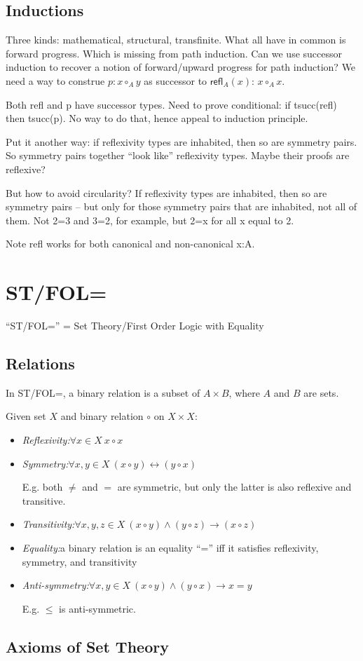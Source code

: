 \documentclass{article}
\begin{document}
\subsection{Inductions}

Three kinds: mathematical, structural, transfinite.  What all have in
common is forward progress.  Which is missing from path induction.
Can we use successor induction to recover a notion of forward/upward
progress for path induction?  We need a way to construe \(p{:}x\circ_A
y\) as successor to \(\textsf{refl}_A(x){:}\,x\circ_A x\).

Both refl and p have successor types.  Need to prove conditional: if
tsucc(refl) then tsucc(p).  No way to do that, hence appeal to induction
principle.

Put it another way: if reflexivity types are inhabited, then so are
symmetry pairs.  So symmetry pairs together ``look like'' reflexivity
types.  Maybe their proofs are reflexive?

But how to avoid circularity?  If reflexivity types are inhabited,
then so are symmetry pairs -- but only for those symmetry pairs that
are inhabited, not all of them.  Not 2=3 and 3=2, for example, but 2=x
for all x equal to 2.

Note refl works for both canonical and non-canonical x:A.

\section{ST/FOL=}

``ST/FOL='' = Set Theory/First Order Logic with Equality

\subsection{Relations}

In ST/FOL=, a binary relation is a subset of \(A\times B\), where
\(A\) and \(B\) are sets.

Given set \(X\) and binary relation \(\circ\) on \(X\times X\):

\begin{itemize}
\item \textit{Reflexivity:}\quad \(\forall x\in X\ x\circ x\)
\item \textit{Symmetry:}\quad \(\forall x,y\in X\  (x\circ y)\leftrightarrow (y\circ x)\)

  E.g. both \(\neq\) and \(=\) are symmetric, but only the latter is also reflexive and transitive.
\item \textit{Transitivity:}\quad \(\forall x,y,z\in X\  (x\circ y)\land(y\circ z)\to (x\circ z)\)
\item \textit{Equality:}\quad a binary relation is an equality ``='' iff it satisfies reflexivity, symmetry, and transitivity
\item \textit{Anti-symmetry:}\quad \(\forall x,y\in X\  (x\circ y)\land(y\circ x)\to x=y\)

  E.g. \(\leq\) is anti-symmetric.
\end{itemize}

\subsection{Axioms of Set Theory}
\end{document}
